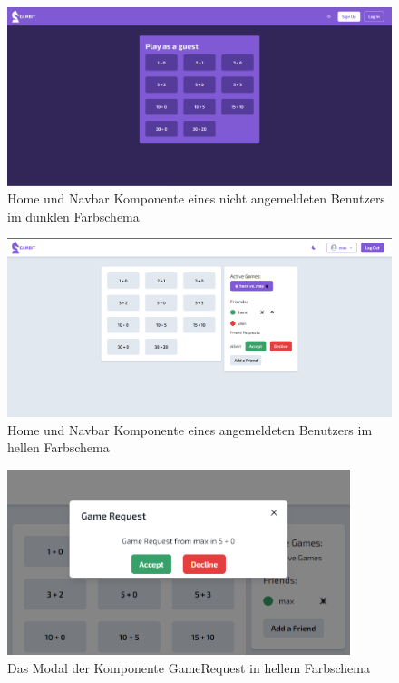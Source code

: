 \documentclass[a4paper,12pt]{report}
\begin{document}
  \begin{figure}[ht]
  \centering
  \includegraphics[width=160mm]{Home_not_logged_in.png}
  \caption{Home und Navbar Komponente eines nicht angemeldeten Benutzers im dunklen Farbschema}
  \label{fig:home-not-logged-in}
\end{figure}
  
    \begin{figure}[ht]
    \centering
  \includegraphics[width=160mm]{Home_logged_in.png}
  \caption{Home und Navbar Komponente eines angemeldeten Benutzers im hellen Farbschema}
  \label{fig:home-logged-in}
\end{figure}
  
      \begin{figure}[ht]
      \centering
  \includegraphics[width=100mm]{game_request.png}
  \caption{Das Modal der Komponente GameRequest in hellem Farbschema}
  \label{fig:game-request}
\end{figure}
\end{document}
